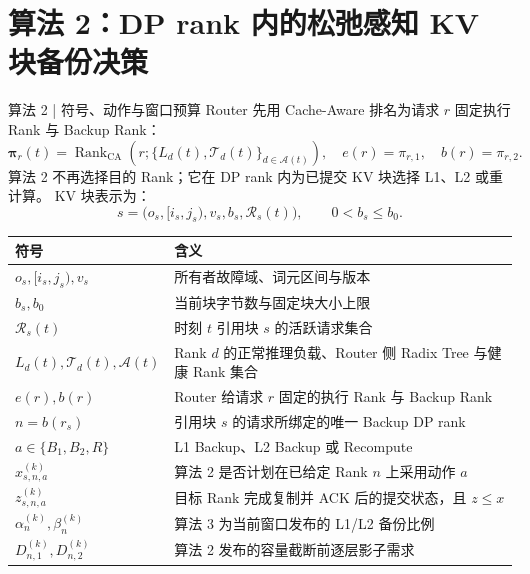 \section{算法 2：DP rank 内的松弛感知 KV 块备份决策}

\begin{frame}{算法 2 | 符号、动作与窗口预算}
  \scriptsize
  Router 先用 Cache-Aware 排名为请求 $r$ 固定执行 Rank 与 Backup Rank：
  \begin{equation}
    \boldsymbol\pi_r(t)=\operatorname{Rank}_{\mathrm{CA}}
      \!\left(r;\{L_d(t),\mathcal T_d(t)\}_{d\in\mathcal A(t)}\right),
    \quad e(r)=\pi_{r,1},\quad b(r)=\pi_{r,2}.
    \label{eq:router-top2}
  \end{equation}
  算法 2 不再选择目的 Rank；它在 DP rank 内为已提交 KV 块选择 L1、L2 或重计算。
  KV 块表示为：
  \begin{equation}
    s=
    \bigl(
      o_s,[i_s,j_s),v_s,b_s,\mathcal R_s(t)
    \bigr),
    \qquad 0<b_s\le b_0.
    \label{eq:segment-tuple}
  \end{equation}

  \tiny
  \renewcommand{\arraystretch}{1.00}
  \begin{tabularx}{\textwidth}{p{}X}
    \toprule
    符号 & 含义 \\
    \midrule
    $o_s,[i_s,j_s),v_s$ & 所有者故障域、词元区间与版本 \\
    $b_s,b_0$ & 当前块字节数与固定块大小上限 \\
    $\mathcal R_s(t)$ & 时刻 $t$ 引用块 $s$ 的活跃请求集合 \\
    $L_d(t),\mathcal T_d(t),\mathcal A(t)$ & Rank $d$ 的正常推理负载、Router 侧 Radix Tree 与健康 Rank 集合 \\
    $e(r),b(r)$ & Router 给请求 $r$ 固定的执行 Rank 与 Backup Rank \\
    $n=b(r_s)$ & 引用块 $s$ 的请求所绑定的唯一 Backup DP rank \\
    $a\in\{B_1,B_2,R\}$ & L1 Backup、L2 Backup 或 Recompute \\
    $x_{s,n,a}^{(k)}$ & 算法 2 是否计划在已给定 Rank $n$ 上采用动作 $a$ \\
    $z_{s,n,a}^{(k)}$ & 目标 Rank 完成复制并 ACK 后的提交状态，且 $z\le x$ \\
    $\alpha_n^{(k)},\beta_n^{(k)}$ & 算法 3 为当前窗口发布的 L1/L2 备份比例 \\
    $D_{n,1}^{(k)},D_{n,2}^{(k)}$ & 算法 2 发布的容量截断前逐层影子需求 \\
    \bottomrule
  \end{tabularx}

  \vspace{0.02cm}
\end{frame}

